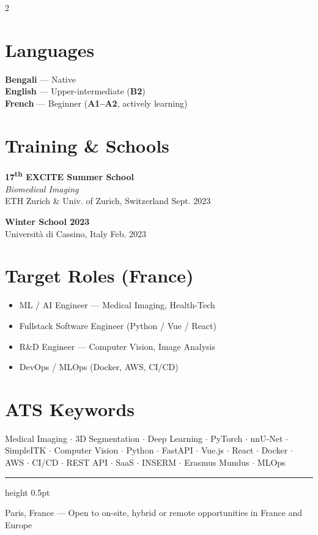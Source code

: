 \documentclass[10pt, a4paper]{article}
\begin{document}
\begin{paracol}{2}
\section{Languages}

\textbf{Bengali} — Native\\[1pt]
\textbf{English} — Upper-intermediate (\textbf{B2})\\[1pt]
\textbf{French} — Beginner (\textbf{A1–A2}, actively learning)

\section{Training \& Schools}

\textbf{17\textsuperscript{th} EXCITE Summer School}\\
\textit{Biomedical Imaging}\\
{\small ETH Zurich \& Univ. of Zurich, Switzerland \hfill \textcolor{accent}{Sept. 2023}}

\vspace{4pt}
\textbf{Winter School 2023}\\
{\small Università di Cassino, Italy \hfill \textcolor{accent}{Feb. 2023}}

\section{Target Roles (France)}

\begin{itemize}
  \item ML / AI Engineer — Medical Imaging, Health-Tech
  \item Fullstack Software Engineer (Python / Vue / React)
  \item R\&D Engineer — Computer Vision, Image Analysis
  \item DevOps / MLOps (Docker, AWS, CI/CD)
\end{itemize}

\section{ATS Keywords}

\vspace{1pt}
{\scriptsize\color{graytext}
Medical Imaging $\cdot$ 3D Segmentation $\cdot$ Deep Learning $\cdot$ PyTorch $\cdot$ nnU-Net $\cdot$ SimpleITK $\cdot$ Computer Vision $\cdot$ Python $\cdot$ FastAPI $\cdot$ Vue.js $\cdot$ React $\cdot$ Docker $\cdot$ AWS $\cdot$ CI/CD $\cdot$ REST API $\cdot$ SaaS $\cdot$ INSERM $\cdot$ Erasmus Mundus $\cdot$ MLOps
}

\end{paracol}

\vspace{6pt}
{\color{rulecol}\hrule height 0.5pt}
\vspace{3pt}
\begin{center}
  \scriptsize\color{graytext}
  Paris, France — Open to on-site, hybrid or remote opportunities in France and Europe
\end{center}
\end{document}

